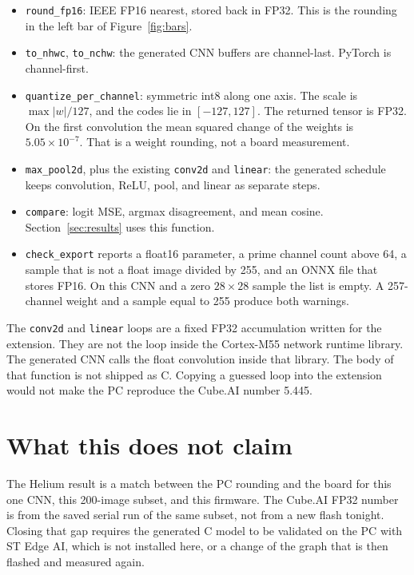 \documentclass[11pt]{article}
\begin{document}
\begin{itemize}
  \item \texttt{round\_fp16}: IEEE FP16 nearest, stored back in FP32. This is the rounding in the left bar of Figure~\ref{fig:bars}.
  \item \texttt{to\_nhwc}, \texttt{to\_nchw}: the generated CNN buffers are channel-last. PyTorch is channel-first.
  \item \texttt{quantize\_per\_channel}: symmetric int8 along one axis.
        The scale is \(\max|w|/127\), and the codes lie in \([-127,127]\).
        The returned tensor is FP32.
        On the first convolution the mean squared change of the weights is \(5.05\times 10^{-7}\).
        That is a weight rounding, not a board measurement.
  \item \texttt{max\_pool2d}, plus the existing \texttt{conv2d} and \texttt{linear}: the generated schedule keeps convolution, ReLU, pool, and linear as separate steps.
  \item \texttt{compare}: logit MSE, argmax disagreement, and mean cosine. Section~\ref{sec:results} uses this function.
  \item \texttt{check\_export} reports a float16 parameter, a prime channel count above 64,
        a sample that is not a float image divided by 255, and an ONNX file that stores FP16.
        On this CNN and a zero \(28\times 28\) sample the list is empty.
        A 257-channel weight and a sample equal to 255 produce both warnings.
\end{itemize}

The \texttt{conv2d} and \texttt{linear} loops are a fixed FP32 accumulation written for the extension.
They are not the loop inside the Cortex-M55 network runtime library.
The generated CNN calls the float convolution inside that library.
The body of that function is not shipped as C.
Copying a guessed loop into the extension would not make the PC reproduce the Cube.AI number 5.445.

\section{What this does not claim}
The Helium result is a match between the PC rounding and the board for this one CNN, this 200-image subset, and this firmware. The Cube.AI FP32 number is from the saved serial run of the same subset, not from a new flash tonight. Closing that gap requires the generated C model to be validated on the PC with ST Edge AI, which is not installed here, or a change of the graph that is then flashed and measured again.
\end{document}
